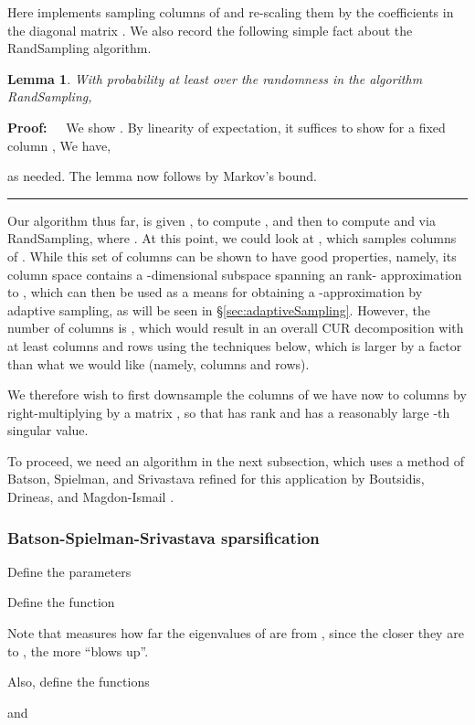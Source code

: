 \documentclass[11pt]{article}
\newtheorem{lemma}[theorem]{Lemma}
\newenvironment{proof}{\begin{trivlist} \item {\bf Proof:~~}}
  {\qed\end{trivlist}}
\def\qed{\hfill\rule{2mm}{2mm}}
\begin{document}
Here  implements sampling  columns of  and re-scaling them by the coefficients
in the diagonal matrix . We also record the following simple fact about the {\textsc RandSampling}
algorithm.
\begin{lemma}\label{lem:FrobLSS}
With probability at least  over the randomness in the algorithm {\textsc RandSampling},

\end{lemma}
\begin{proof}
We show . 
By linearity of expectation, it suffices to show for a fixed column ,
 We have, 

as needed. The lemma now follows by Markov's bound. 
\end{proof}

Our algorithm thus far, is given , to compute , and then to compute  and  via
{\textsc RandSampling}, 
where . At this point, we could look at , which
samples  columns of . While this set of columns can be shown to have good properties, namely, 
its column space contains a -dimensional subspace spanning an  rank- approximation to , which can then
be used as a means for obtaining a -approximation by adaptive sampling, as will be seen in 
\S\ref{sec:adaptiveSampling}. However, the number of columns is , which would result in an overall
CUR decomposition with at least  columns and rows using the techniques below, 
which is larger by a  factor than what we would like (namely,  columns and rows). 

We therefore
wish to first downsample the  columns of  we have now to  columns by right-multiplying by a matrix 
, so that  
has rank  and has a reasonably large -th singular
value. 

To proceed, we need an algorithm in the next subsection, 
which uses a method of Batson, Spielman, and Srivastava \cite{BSS09}
refined for this application by Boutsidis, Drineas, and Magdon-Ismail \cite{BDM11a}.

\subsubsection{Batson-Spielman-Srivastava sparsification}\label{sec:bss}
Define
the parameters

Define the function

Note that  measures how far the eigenvalues of  are from , since the closer they
are to , the more  ``blows up''. 

Also, define the functions

and
\end{document}
